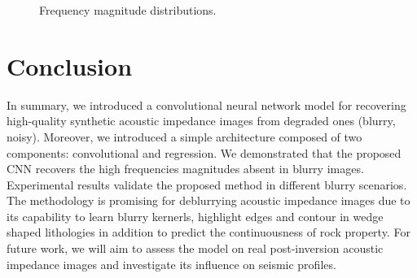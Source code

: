 \documentclass[conference]{IEEEtran}
\begin{document}
\begin{figure}[!h]
{		
	}
	\caption{Frequency magnitude distributions.}
	\label{fig_frequencies}
\end{figure}
\section{Conclusion}
In summary, we introduced a convolutional neural network model for recovering high-quality
synthetic acoustic impedance images from degraded ones (blurry, noisy). Moreover,
we introduced a simple architecture composed of two components: convolutional and regression.
We demonstrated that the proposed CNN recovers the high frequencies magnitudes absent in blurry images. Experimental results validate the proposed method in different blurry scenarios. The methodology is promising for deblurrying acoustic impedance images due to its capability to learn blurry kernerls, highlight edges and contour in wedge shaped lithologies in addition to predict the continuousness of rock property. For future work, we will aim to assess the model on real post-inversion acoustic impedance images and investigate its influence on seismic profiles.
\end{document}
